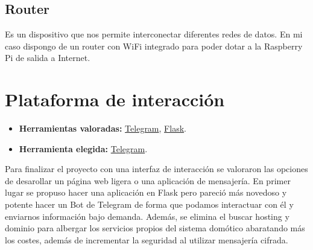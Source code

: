 \subsection{Router}\label{4:Router}
Es un dispositivo que nos permite interconectar diferentes redes de datos. En mi caso dispongo de un router con WiFi integrado para poder dotar a la Raspberry Pi de salida a Internet.

\section{Plataforma de interacción}\label{4:telegram}
\begin{itemize}
    \item \textbf{Herramientas valoradas:} \href{https://telegram.org/}{Telegram}, \href{https://palletsprojects.com/p/flask/}{Flask}.
    \item \textbf{Herramienta elegida:} \href{https://telegram.org/}{Telegram}.
\end{itemize}
Para finalizar el proyecto con una interfaz de interacción se valoraron las opciones de desarollar un página web ligera o una aplicación de mensajería.
En primer lugar se propuso hacer una aplicación en Flask pero pareció más novedoso y potente hacer un Bot de Telegram de forma que podamos interactuar con él y enviarnos información bajo demanda. Además, se elimina el buscar hosting y dominio para albergar los servicios propios del sistema domótico abaratando más los costes, además de incrementar la seguridad al utilizar mensajería cifrada.

